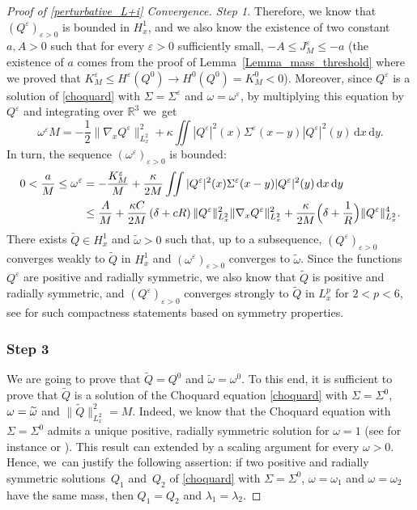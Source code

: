\documentclass[10pt]{amsart}
\theoremstyle{definition}
\newenvironment{ProofOf}[1]{\begin{proof}[Proof of #1]}{\end{proof}}
\newcommand{\R}{\mathbb{R}}
\newcommand{\ud}{\, {\mathrm{d}}}
\begin{document}
\begin{ProofOf}{\eqref{perturbative_L+i} Convergence. Step 1}
Therefore, we know that $(Q^{\varepsilon})_{\varepsilon>0}$ is bounded in $H_{x}^{1}$, and we also know the existence of two constant $a,A>0$ such that for every $\varepsilon>0$ sufficiently small, \hbox{$-A\leq J_{M}^{\varepsilon}\leq -a$} (the existence of $a$ comes from the proof of Lemma~\ref{Lemma_mass_threshold} where we proved that \hbox{$K_{M}^{\varepsilon}\leq H^{\varepsilon}(Q^{0})\to H^{0}(Q^{0})=K_{M}^{0}<0$}). Moreover, since $Q^{\varepsilon}$ is a solution of \eqref{choquard} with $\Sigma=\Sigma^{\varepsilon}$ and $\omega=\omega^{\varepsilon}$, by multiplying this equation by $Q^{\varepsilon}$ and integrating over $\R^{3}$ we~get
\[
\omega^{\varepsilon}M=-\frac{1}{2}\|\nabla_{x}Q^{\varepsilon}\|_{L_{x}^{2}}^{2}+\kappa\iint|Q^{\varepsilon}|^{2}(x)\Sigma^{\varepsilon}(x-y)|Q^{\varepsilon}|^{2}(y)\ud x\ud y.
\]
In turn, the sequence $(\omega^{\varepsilon})_{\varepsilon>0}$ is bounded:
\begin{align*}
0<\frac{a}{M}\leq\omega^{\varepsilon}&=-\frac{K_{M}^{\varepsilon}}{M}+\frac{\kappa}{2M}\iint|Q^{\varepsilon}|^{2}(x)\Sigma^{\varepsilon}(x-y)|Q^{\varepsilon}|^{2}(y)\ud x\ud y\\
&\leq\frac{A}{M}+\frac{\kappa C}{2M}\left(\delta+cR\right)\|Q^{\varepsilon}\|_{L_{x}^{2}}^{2}\|\nabla_{x}Q^{\varepsilon}\|_{L_{x}^{2}}^{2}+\frac{\kappa}{2M}\Bigl(\delta+\frac{1}{R} \Bigr)\|Q^{\varepsilon}\|_{L_{x}^{2}}^{4}.
\end{align*}
There exists $\widetilde{Q}\in H_{x}^{1}$ and $\widetilde{\omega}>0$ such that, up to a subsequence, $(Q^{\varepsilon})_{\varepsilon>0}$ converges weakly to $\widetilde{Q}$ in $H_{x}^{1}$ and $(\omega^{\varepsilon})_{\varepsilon>0}$ converges to $\widetilde{\omega}$. Since the functions $Q^{\varepsilon}$ are positive and radially symmetric,
we also know that $\widetilde{Q}$ is positive and radially symmetric, and $(Q^{\varepsilon})_{\varepsilon>0}$ converges strongly to $\widetilde{Q}$ in $L_{x}^{p}$ for $2<p<6$,
see \cite{Pllsc,Strauss} for such compactness statements based on symmetry properties.

\subsubsection*{Step 3} We are going to prove that $\widetilde{Q}=Q^{0}$ and $\widetilde{\omega}=\omega^{0}$. To this end, it is sufficient to prove that $\widetilde{Q}$ is a solution of the Choquard equation \eqref{choquard} with $\Sigma=\Sigma^{0}$, $\omega=\nobreak\widetilde{\omega}$ and $\|\widetilde{Q}\|_{L_{x}^{2}}^{2}=M$. Indeed, we know that the Choquard equation with $\Sigma=\Sigma^{0}$ admits a unique positive, radially symmetric solution for $\omega=1$ (see for instance \cite{Lieb_Choquard} or \cite[App.\,A]{Lenzmann}).
This result can extended by a scaling argument for every $\omega>0$.
Hence, we~can justify the following assertion: if two positive and radially symmetric solutions~$Q_{1}$ and~$Q_{2}$ of \eqref{choquard} with $\Sigma=\Sigma^{0}$, $\omega=\omega_{1}$ and $\omega=\omega_{2}$ have the same mass, then $Q_{1}=Q_{2}$ and $\lambda_{1}=\lambda_{2}$.


\end{ProofOf}
\end{document}
